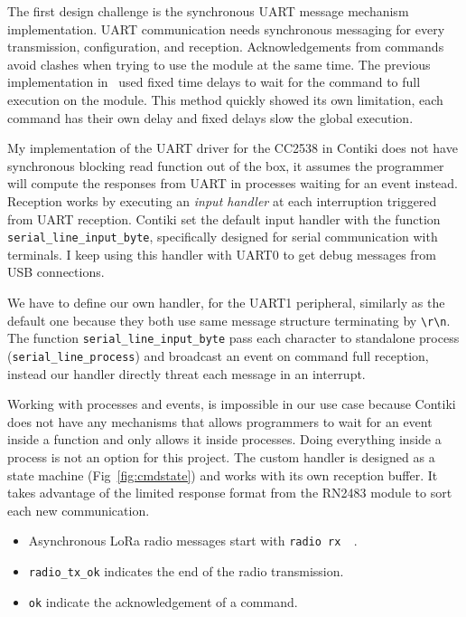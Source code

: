 The first design challenge is the
synchronous UART message mechanism implementation.
UART communication needs synchronous messaging for every
transmission, configuration, and reception.
Acknowledgements from commands avoid 
clashes when trying to use the module at the same time.
The previous implementation in~\cite{8847137} used fixed time delays to 
wait for the command to full execution on the module. This method 
quickly showed its own limitation, each command has their own delay and
fixed delays slow the global execution.


My implementation of the UART driver for the CC2538 in Contiki does not have synchronous 
blocking read function out of the box, it assumes the programmer will compute the
responses from UART in processes waiting for an event instead.
Reception works by executing an \emph{input handler} at each interruption
triggered from UART reception.
Contiki set the default input handler with the function
\lstinline{serial_line_input_byte},
specifically designed for serial communication with terminals. 
I keep using this handler with UART0 to get debug messages from USB connections.

We have to define our own handler, for the UART1 peripheral, similarly as the
default one because they both use same message structure terminating by
\lstinline{\r\n}.
The function \lstinline{serial_line_input_byte} pass each character to standalone
process (\lstinline{serial_line_process}) and broadcast an event on command
full reception, instead our handler directly threat each message in an
interrupt.

Working with processes and events, is impossible in our use case because Contiki 
does not have any mechanisms that allows programmers to wait for an event inside a 
function and only allows it inside processes.
Doing everything inside a process is not an option for this project.
The custom handler is designed as a state machine (Fig~\ref{fig:cmdstate}) and 
works with its own reception buffer. It takes advantage of the limited response 
format from the RN2483 module to sort each new communication.

\begin{itemize}
  \item Asynchronous LoRa radio messages start with \lstinline{radio rx  }.
  \item \lstinline{radio_tx_ok} indicates the end of the radio transmission. 
  \item \lstinline{ok} indicate the acknowledgement of a command.
\end{itemize}

